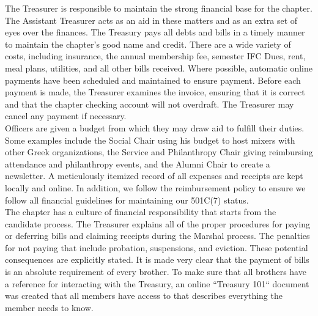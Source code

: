     The Treasurer is responsible to maintain the strong financial base for the chapter. The Assistant Treasurer acts as an aid in these matters and as an extra set of eyes over the finances. The Treasury pays all debts and bills in a timely manner to maintain the chapter's good name and credit. There are a wide variety of costs, including insurance, the annual membership fee, semester IFC Dues, rent, meal plans, utilities, and all other bills received. Where possible, automatic online payments have been scheduled and maintained to ensure payment. Before each payment is made, the Treasurer examines the invoice, ensuring that it is correct and that the chapter checking account will not overdraft. The Treasurer may cancel any payment if necessary. \\

    Officers are given a budget from which they may draw aid to fulfill their duties. Some examples include the Social Chair using his budget to host mixers with other Greek organizations, the Service and Philanthropy Chair giving reimbursing attendance and philanthropy events, and the Alumni Chair to create a newsletter. A meticulously itemized record of all expenses and receipts are kept locally and online. In addition, we follow the reimbursement policy to ensure we follow all financial guidelines for maintaining our 501C(7) status. \\

    The chapter has a culture of financial responsibility that starts from the candidate process. The Treasurer explains all of the proper procedures for paying or deferring bills and claiming receipts during the Marshal process. The penalties for not paying that include probation, suspensions, and eviction. These potential consequences are explicitly stated. It is made very clear that the payment of bills is an absolute requirement of every brother. To make sure that all brothers have a reference for interacting with the Treasury, an online ``Treasury 101`` document was created that all members have access to that describes everything the member needs to know. \\


